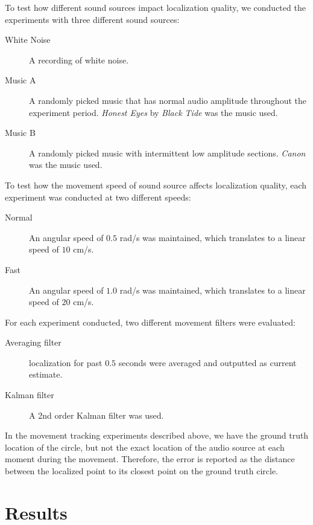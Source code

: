 To test how different sound sources impact localization quality, we conducted the experiments with three different sound sources:
\begin{description}%

\item[White Noise] A recording of white noise.

\item[Music A] A randomly picked music that has normal audio amplitude throughout the experiment period. \emph{Honest Eyes} by \emph{Black Tide} was the music used.

\item[Music B] A randomly picked music with intermittent low amplitude sections. \emph{Canon} was the music used.

\end{description} 

To test how the movement speed of sound source affects localization quality, each experiment was conducted at two different speeds:
\begin{description}
\item[Normal] An angular speed of $0.5$ rad/s was maintained, which translates to a linear speed of $10$ cm/s.
\item[Fast] An angular speed of $1.0$ rad/s was maintained, which translates to a linear speed of $20$ cm/s.
\end{description}

For each experiment conducted, two different movement filters were evaluated:
\begin{description}%
\item[Averaging filter] localization for past $0.5$ seconds were averaged and outputted as current estimate.
\item[Kalman filter] A 2nd order Kalman filter was used.
\end{description}

In the movement tracking experiments described above, we have the ground truth location of the circle, but not the exact location of the audio source at each moment during the movement. Therefore, the error is reported as the distance between the localized point to its closest point on the ground truth circle.

\section{Results}
